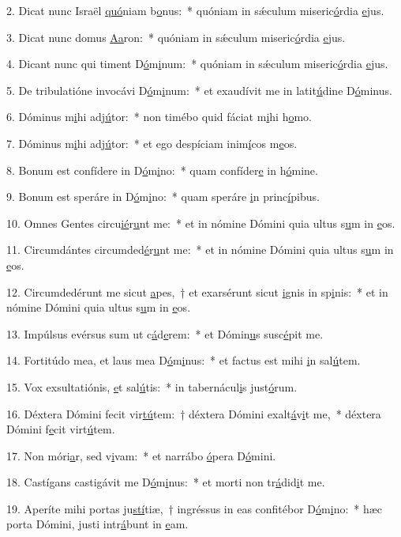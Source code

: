 2. Dicat nunc Israël \uline{quó}niam b\uline{o}nus:~* quóniam in sǽculum miseric\uline{ó}rdia \uline{e}jus.\par 
3. Dicat nunc domus \uline{A}\uline{a}ron:~* quóniam in sǽculum miseric\uline{ó}rdia \uline{e}jus.\par 
4. Dicant nunc qui timent D\uline{ó}m\uline{i}num:~* quóniam in sǽculum miseric\uline{ó}rdia \uline{e}jus.\par 
5. De tribulatióne invocávi D\uline{ó}m\uline{i}num:~* et exaudívit me in latit\uline{ú}dine D\uline{ó}minus.\par 
6. Dóminus m\uline{i}hi adj\uline{ú}tor:~* non timébo quid fáciat m\uline{i}hi h\uline{o}mo.\par 
7. Dóminus m\uline{i}hi adj\uline{ú}tor:~* et ego despíciam inim\uline{í}cos m\uline{e}os.\par 
8. Bonum est confídere in D\uline{ó}m\uline{i}no:~* quam confíder\uline{e} in h\uline{ó}mine.\par 
9. Bonum est speráre in D\uline{ó}m\uline{i}no:~* quam speráre \uline{i}n princ\uline{í}pibus.\par 
10. Omnes Gentes circu\uline{ié}r\uline{u}nt me:~* et in nómine Dómini quia ultus s\uline{u}m in \uline{e}os.\par 
11. Circumdántes circumded\uline{é}r\uline{u}nt me:~* et in nómine Dómini quia ultus s\uline{u}m in \uline{e}os.\par 
12. Circumdedérunt me sicut \uline{a}pes,~† et exarsérunt sicut \uline{i}gnis in sp\uline{i}nis:~* et in nómine Dómini quia ultus s\uline{u}m in \uline{e}os.\par 
13. Impúlsus evérsus sum ut c\uline{á}d\uline{e}rem:~* et Dómin\uline{u}s susc\uline{é}pit me.\par 
14. Fortitúdo mea, et laus mea D\uline{ó}m\uline{i}nus:~* et factus est mihi \uline{i}n sal\uline{ú}tem.\par 
15. Vox exsultatiónis, \uline{e}t sal\uline{ú}tis:~* in tabernácul\uline{i}s just\uline{ó}rum.\par 
16. Déxtera Dómini fecit vir\uline{tú}tem:~† déxtera Dómini exalt\uline{á}v\uline{i}t me,~* déxtera Dómini f\uline{e}cit virt\uline{ú}tem.\par 
17. Non móri\uline{a}r, sed v\uline{i}vam:~* et narrábo \uline{ó}pera D\uline{ó}mini.\par 
18. Castígans castigávit me D\uline{ó}m\uline{i}nus:~* et morti non tr\uline{á}did\uline{i}t me.\par 
19. Aperíte mihi portas ju\uline{stí}tiæ,~† ingréssus in eas confitébor D\uline{ó}m\uline{i}no:~* hæc porta Dómini, justi intr\uline{á}bunt in \uline{e}am.\par 
